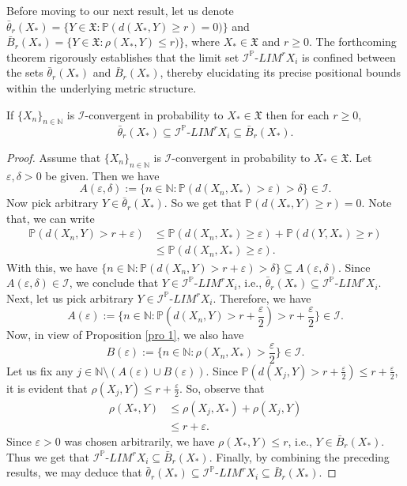 \documentclass[reqno]{amsart}
\begin{document}
Before moving to our next result, let us denote $\bar{\theta}_r(X_*)=\{Y\in\mathfrak{X}:\mathbb{P}(d(X_*,Y)\geq r)=0)\}$ and $\bar{B}_r(X_*)=\{Y\in\mathfrak{X}:\rho(X_*,Y)\leq r)\}$, where $X_*\in \mathfrak{X}$ and $r\geq 0$. The forthcoming theorem rigorously establishes that the limit set $\mathcal{I}^{\mathbb{P}}$-$LIM^rX_i$ is confined between the sets $\bar{\theta}_r(X_*)$ and $\bar{B}_r(X_*)$, thereby elucidating its precise positional bounds within the underlying metric structure.
\begin{theorem}
	If $\{X_n\}_{n\in\mathbb{N}}$ is $\mathcal{I}$-convergent in probability to $X_*\in \mathfrak{X}$ then for each $r\geq0$,
	$$ \bar{\theta}_r(X_*)\subseteq\mbox{$\mathcal{I}^{\mathbb{P}}$-$LIM^rX_i$}\subseteq \bar{B}_r(X_*).$$
\end{theorem}
\begin{proof}
Assume that $\{X_n\}_{n\in\mathbb{N}}$ is $\mathcal{I}$-convergent in probability to $X_*\in \mathfrak{X}$. Let $\varepsilon,\delta>0$ be given. Then we have
$$
A(\varepsilon,\delta):=\{n\in\mathbb{N}:\mathbb{P}(d(X_n,X_*)>\varepsilon)>\delta\}\in\mathcal{I}.
$$
Now pick arbitrary $Y\in \bar{\theta}_r(X_*)$. So we get that $\mathbb{P}(d(X_*,Y)\geq r)=0$. Note that, we can write
\begin{align*}
\mathbb{P}(d(X_n,Y)>r+\varepsilon)&\leq \mathbb{P}(d(X_n,X_*)\geq\varepsilon)+\mathbb{P}(d(Y,X_*)\geq r)\\
&\leq  \mathbb{P}(d(X_n,X_*)\geq\varepsilon).
\end{align*}
With this, we have $\{n\in\mathbb{N}:\mathbb{P}(d(X_n,Y)>r+\varepsilon)>\delta\}\subseteq A(\varepsilon,\delta)$. Since 
  $A(\varepsilon,\delta)\in\mathcal{I}$, we conclude that $Y\in$$\mathcal{I}^{\mathbb{P}}$-$LIM^rX_i$, i.e., $\bar{\theta}_r(X_*)\subseteq\mathcal{I}^{\mathbb{P}}$-$LIM^rX_i$.\\
  
  Next, let us pick arbitrary $Y\in\mathcal{I}^{\mathbb{P}}$-$LIM^rX_i$. Therefore, we have 
  $$
  A(\varepsilon):=\{n\in\mathbb{N}:\mathbb{P}(d(X_n,Y)>r+\frac{\varepsilon}{2})>r+\frac{\varepsilon}{2}\}\in\mathcal{I}.
  $$
  Now, in view of Proposition \ref{pro 1}, we also have 
  $$
  B(\varepsilon):=\{n\in\mathbb{N}:\rho(X_n,X_*)>\frac{\varepsilon}{2}\}\in\mathcal{I}.
  $$
  Let us fix any $j\in \mathbb{N}\setminus(A(\varepsilon)\cup B(\varepsilon))$. Since $\mathbb{P}(d(X_j,Y)>r+\frac{\varepsilon}{2})\leq r+\frac{\varepsilon}{2}$, it is evident that $\rho(X_j,Y)\leq r+\frac{\varepsilon}{2}$. So, observe that 
  \begin{align*}
  \rho(X_*,Y)&\leq \rho(X_j,X_*)+\rho(X_j,Y)\\
  &\leq r+\varepsilon.
  \end{align*}
Since $\varepsilon>0$ was chosen arbitrarily, we have $\rho(X_*,Y)\leq r$, i.e., $Y\in \bar{B}_r(X_*)$. Thus we get that $\mathcal{I}^{\mathbb{P}}$-$LIM^rX_i\subseteq \bar{B}_r(X_*)$. Finally, by combining the preceding results, we may deduce that $ \bar{\theta}_r(X_*)\subseteq\mathcal{I}^{\mathbb{P}}$-$LIM^rX_i\subseteq \bar{B}_r(X_*).$
\end{proof}
\end{document}

